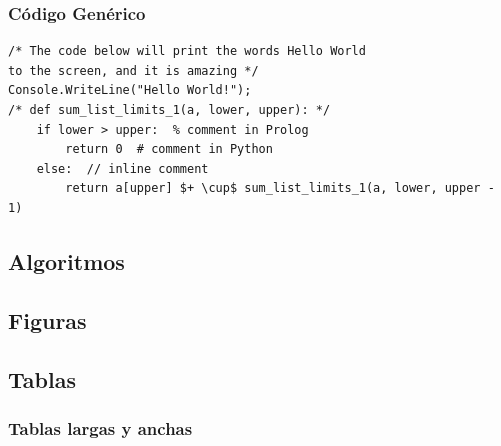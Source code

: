 \documentclass[twoside]{urjc-tfg}
\begin{document}
\subsubsection{Código Genérico}

\begin{lstlisting}
/* The code below will print the words Hello World
to the screen, and it is amazing */
Console.WriteLine("Hello World!"); 
/* def sum_list_limits_1(a, lower, upper): */
    if lower > upper:  % comment in Prolog
        return 0  # comment in Python 
    else:  // inline comment
        return a[upper] $+ \cup$ sum_list_limits_1(a, lower, upper - 1)
\end{lstlisting}


\subsection{Algoritmos}

\subsection{Figuras}

\subsection{Tablas} 


\subsubsection{Tablas largas y anchas}
\end{document}
